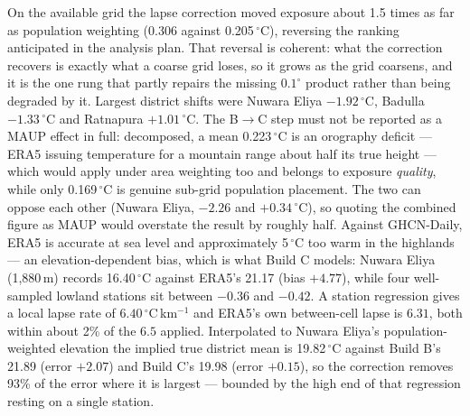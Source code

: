 \documentclass[11pt,a4paper]{article}
\begin{document}
On the available grid the lapse correction moved exposure about 1.5 times as far as population weighting (0.306 against 0.205\,$^{\circ}$C), reversing the ranking anticipated in the analysis plan. That reversal is coherent: what the correction recovers is exactly what a coarse grid loses, so it grows as the grid coarsens, and it is the one rung that partly repairs the missing $0.1^{\circ}$ product rather than being degraded by it. Largest district shifts were Nuwara Eliya $-1.92\,^{\circ}$C, Badulla $-1.33\,^{\circ}$C and Ratnapura $+1.01\,^{\circ}$C. The B$\to$C step must not be reported as a MAUP effect in full: decomposed, a mean 0.223\,$^{\circ}$C is an orography deficit --- ERA5 issuing temperature for a mountain range about half its true height --- which would apply under area weighting too and belongs to exposure \emph{quality}, while only 0.169\,$^{\circ}$C is genuine sub-grid population placement. The two can oppose each other (Nuwara Eliya, $-2.26$ and $+0.34\,^{\circ}$C), so quoting the combined figure as MAUP would overstate the result by roughly half. Against GHCN-Daily, ERA5 is accurate at sea level and approximately 5\,$^{\circ}$C too warm in the highlands --- an elevation-dependent bias, which is what Build C models: Nuwara Eliya (1{,}880\,m) records 16.40\,$^{\circ}$C against ERA5's 21.17 (bias $+4.77$), while four well-sampled lowland stations sit between $-0.36$ and $-0.42$. A station regression gives a local lapse rate of $6.40\,^{\circ}$C\,km$^{-1}$ and ERA5's own between-cell lapse is $6.31$, both within about 2\% of the $6.5$ applied. Interpolated to Nuwara Eliya's population-weighted elevation the implied true district mean is 19.82\,$^{\circ}$C against Build B's 21.89 (error $+2.07$) and Build C's 19.98 (error $+0.15$), so the correction removes 93\% of the error where it is largest --- bounded by the high end of that regression resting on a single station.
\end{document}
